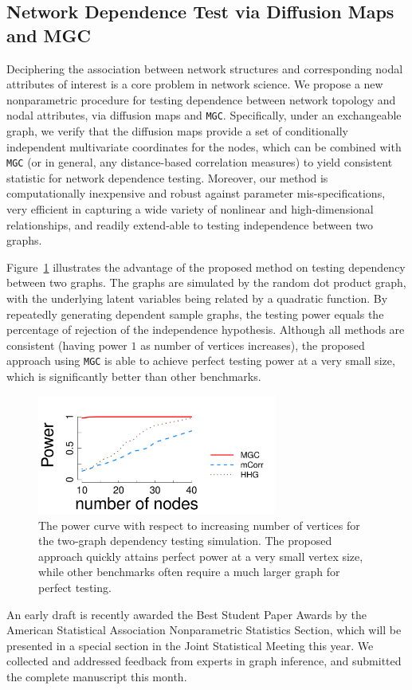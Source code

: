 \documentclass[simplex.tex]{subfiles}
\begin{document}
\subsection{Network Dependence Test via Diffusion Maps and MGC} 
Deciphering the association between network structures and corresponding nodal attributes of interest is a core problem in network science. We propose a new nonparametric procedure for testing dependence between network topology and nodal attributes, via diffusion maps and \texttt{MGC}. Specifically, under an exchangeable graph, we verify that the diffusion maps provide a set of conditionally independent multivariate coordinates for the nodes, which can be combined with \texttt{MGC} (or in general, any distance-based correlation measures) to yield consistent statistic for network dependence testing. Moreover, our method is computationally inexpensive and robust against parameter mis-specifications, very efficient in capturing a wide variety of nonlinear and high-dimensional relationships, and readily extend-able to testing independence between two graphs. 

Figure~\ref{fig:threeSBM} illustrates the advantage of the proposed method on testing dependency between two graphs. The graphs are simulated by the random dot product graph, with the underlying latent variables being related by a quadratic function. By repeatedly generating dependent sample graphs, the testing power equals the percentage of rejection of the independence hypothesis. Although all methods are consistent (having power $1$ as number of vertices increases), the proposed approach using \texttt{MGC} is able to achieve perfect testing power at a very small size, which is significantly better than other benchmarks.

\begin{figure}[h!]
\begin{cframed}
		\centering
		\includegraphics[width=0.7\textwidth]{../../figs/twoGraphs1.pdf}
		\caption{The power curve with respect to increasing number of vertices for the two-graph dependency testing simulation. The proposed approach quickly attains perfect power at a very small vertex size, while other benchmarks often require a much larger graph for perfect testing. }
		\label{fig:threeSBM}
		\end{cframed}
\end{figure}

An early draft is recently awarded the Best Student Paper Awards by the American Statistical Association Nonparametric Statistics Section, which will be presented in a special section in the Joint Statistical Meeting this year. We collected and addressed feedback from experts in graph inference, and submitted the complete manuscript this month.
%
\end{document}
